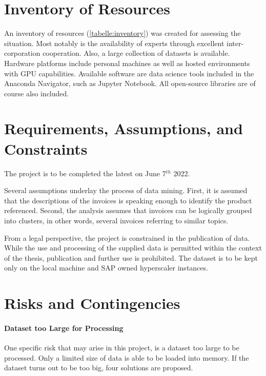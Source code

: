 
\section{Inventory of Resources}
An inventory of resources (\ref{tabelle:inventory}) was created for assessing the situation. Most notably is the availability of experts through excellent inter-corporation cooperation. Also, a large collection of datasets is available. Hardware platforms include personal machines as well as hosted environments with GPU capabilities. Available software are data science tools included in the Anaconda Navigator, such as Jupyter Notebook. All open-source libraries are of course also included.

\section{Requirements, Assumptions, and Constraints}
The project is to be completed the latest on June 7$^{th}$ 2022. 

Several assumptions underlay the process of data mining. First, it is assumed that the descriptions of the invoices is speaking enough to identify the product referenced.
Second, the analysis assumes that invoices can be logically grouped into clusters, in other words, several invoices referring to similar topics.

From a legal perspective, the project is constrained in the publication of data. While the use and processing of the supplied data is permitted within the context of the thesis, publication and further use is prohibited. The dataset is to be kept only on the local machine and SAP owned hyperscaler instances.

\section{Risks and Contingencies}
\paragraph{Dataset too Large for Processing} One specific risk that may arise in this project, is a dataset too large to be processed. Only a limited size of data is able to be loaded into memory. If the dataset turns out to be too big, four solutions are proposed.

